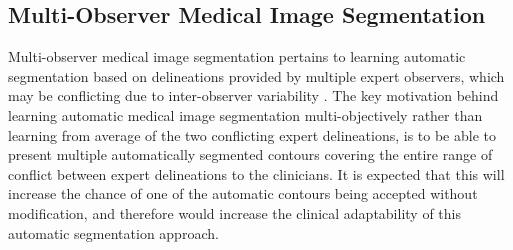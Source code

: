 \subsection{Multi-Observer Medical Image Segmentation}
\label{sec:mo_segmentation}
Multi-observer medical image segmentation pertains to learning automatic segmentation based on delineations provided by multiple expert observers, which may be conflicting due to inter-observer variability \cite{villeirs2005interobserver, white2009inter}. The key motivation behind learning automatic medical image segmentation multi-objectively rather than learning from average of the two conflicting expert delineations, is to be able to present multiple automatically segmented contours covering the entire range of conflict between expert delineations to the clinicians. It is expected that this will increase the chance of one of the automatic contours being accepted without modification, and therefore would increase the clinical adaptability of this automatic segmentation approach. 

